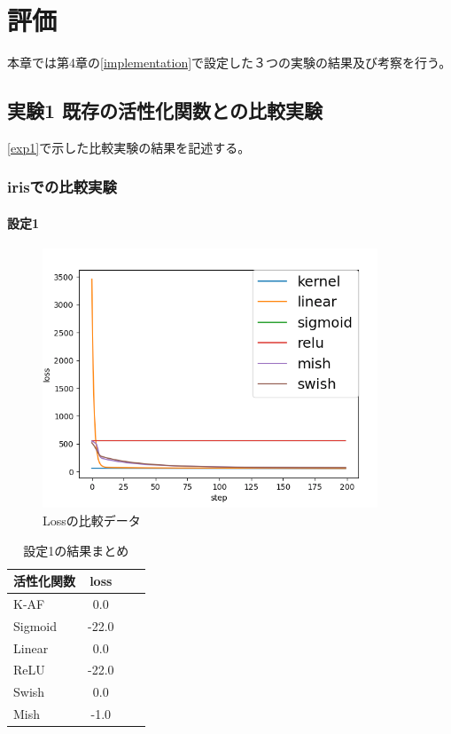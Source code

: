 \chapter{評価}
\label{evaluation}

本章では第4章の\ref{implementation}で設定した３つの実験の結果及び考察を行う。
\section{実験1 既存の活性化関数との比較実験}
\ref{exp1}で示した比較実験の結果を記述する。

\subsection{irisでの比較実験}
\label{ev:iris}

\subsubsection{設定1}


\begin{figure}[hbtp]
    \begin{center}
        \includegraphics[width=10cm]{asset/boston_0000001_SGDkaiming_normal__non_200.png}
            \caption{Lossの比較データ}
            \label{boston}
    \end{center}
\end{figure}


\begin{table}[htbp]
    \begin{center}
        \caption{設定1の結果まとめ}
        \vspace{5mm} 
        \begin{tabular}{l*{2}{c}r}
            活性化関数              & loss \\
            \hline
            K-AF            & 0.0 \\
            Sigmoid            & -22.0 \\
            Linear            & 0.0 \\
            ReLU        & -22.0 \\
            Swish           & 0.0 \\
            Mish           & -1.0 \\
    
        \end{tabular}
    \end{center}
\end{table}


